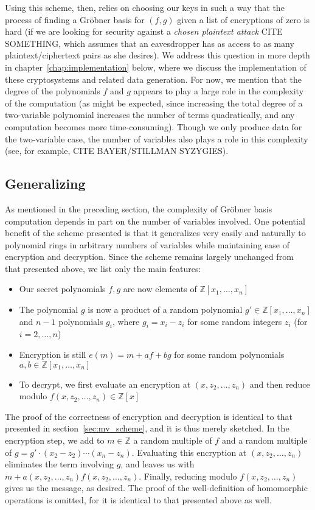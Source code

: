\documentclass[11pt]{report}
\newcommand{\Z}{\mathbb{Z}}
\newcommand{\Zx}{\mathbb{Z}[x]}
\newcommand{\Zxn}{\mathbb{Z}[x_1,\ldots,x_n]}
\begin{document}
Using this scheme, then, relies on choosing our keys in such a way that the process of finding a Gr\"obner basis for $(f,g)$ given a list of encryptions of zero is hard (if we are looking for security against a \emph{chosen plaintext attack} CITE SOMETHING, which assumes that an eavesdropper has as access to as many plaintext/ciphertext pairs as she desires). We address this question in more depth in chapter~\ref{chap:implementation} below, where we discuss the implementation of these cryptosystems and related data generation. For now, we mention that the degree of the polynomials $f$ and $g$ appears to play a large role in the complexity of the computation (as might be expected, since increasing the total degree of a two-variable polynomial increases the number of terms quadratically, and any computation becomes more time-consuming). Though we only produce data for the two-variable case, the number of variables also plays a role in this complexity (see, for example, CITE BAYER/STILLMAN SYZYGIES).


\subsection{Generalizing}
\label{sec:mv_generalizing}
As mentioned in the preceding section, the complexity of Gr\"obner basis computation depends in part on the number of variables involved. One potential benefit of the scheme presented is that it generalizes very easily and naturally to polynomial rings in arbitrary numbers of variables while maintaining ease of encryption and decryption. Since the scheme remains largely unchanged from that presented above, we list only the main features:

\begin{itemize}
\item Our secret polynomials $f,g$ are now elements of $\Zxn$
\item The polynomial $g$ is now a product of a random polynomial $g'\in \Zxn$ and $n-1$ polynomials $g_i$, where $g_i=x_i-z_i$ for some random integers $z_i$ (for $i=2,\dots,n$)
\item Encryption is still $e(m)=m+af+bg$ for some random polynomials $a,b\in \Zxn$
\item To decrypt, we first evaluate an encryption at $(x,z_2,\dots,z_n)$ and then reduce modulo $f(x,z_2,\dots,z_n) \in \Zx$
\end{itemize}

The proof of the correctness of encryption and decryption is identical to that presented in section~\ref{sec:mv_scheme}, and it is thus merely sketched. In the encryption step, we add to $m\in \Z$ a random multiple of $f$ and a random multiple of $g=g'\cdot(x_2-z_2)\cdots(x_n-z_n)$. Evaluating this encryption at $(x,z_2,\dots,z_n)$ eliminates the term involving $g$, and leaves us with $m+a(x,z_2,\dots,z_n)f(x,z_2,\dots,z_n)$. Finally, reducing modulo $f(x,z_2,\dots,z_n)$ gives us the message, as desired. The proof of the well-definition of homomorphic operations is omitted, for it is identical to that presented above as well.
\end{document}
